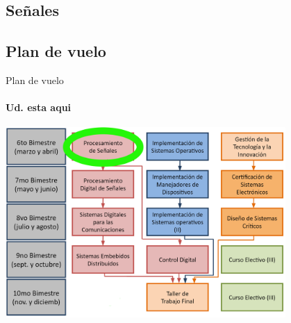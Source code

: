   \begin{darkframes}
    \section{Señales}
    \subsection{Plan de vuelo}
    \begin{frame}{Plan de vuelo}
      \framesubtitle{Ud. esta aqui}
      \center\includegraphics[width=0.8\textwidth]{1_clase/Esquema_MSE}
      \vfill
    \end{frame}



\end{darkframes}
